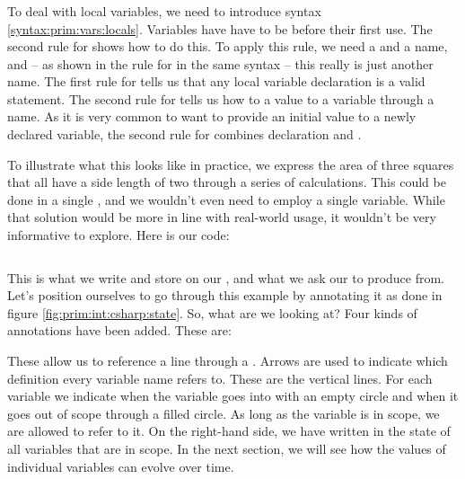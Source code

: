 \subsubsection{\csharp}

To deal with local variables, we need to introduce syntax \ref{syntax:prim:vars:locals}. Variables have have to be  before their first use. The second rule for  shows how to do this. To apply this rule, we need a  and a name, and -- as shown in the rule for  in the same syntax -- this really is just another name. The first rule for  tells us that any local variable declaration is a valid statement. The second rule for  tells us how to  a value to a variable through a name. As it is very common to want to provide an initial value to a newly declared variable, the second rule for  combines declaration and .

\begin{syntaxfloat}
  
  \caption{Local variables.}
  \label{syntax:prim:vars:locals}
\end{syntaxfloat}

To illustrate what this looks like in practice, we express the area of three squares that all have a side length of two through a series of calculations. This could be done in a single , and we wouldn't even need to employ a single variable. While that solution would be more in line with real-world usage, it wouldn't be very informative to explore. Here is our code:

\inputminted[]{csharp}{../src/csharp/primitives/state/Program.cs}

This is what we write and store on our , and what we ask our  to produce  from. Let's position ourselves to go through this example by annotating it as done in figure \ref{fig:prim:int:csharp:state}.
So, what are we looking at? Four kinds of annotations have been added. These are:
\begin{enumerate}
   These allow us  to reference a line through a .
   Arrows are used to indicate which definition every variable name refers to.
   These are the vertical lines. For each variable we indicate when the variable goes into  with an empty circle and when it goes out of scope through a filled circle. As long as the variable is in scope, we are allowed to refer to it.
   On the right-hand side, we have written in the state of all variables that are in scope. In the next section, we will see how the values of individual variables can evolve over time.
\end{enumerate}

